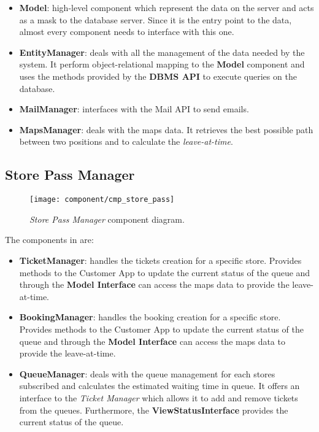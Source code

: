 \begin{itemize}
	\item \textbf{Model}: high-level component which represent the data on the server and acts as a mask to the database server. Since it is the entry point to the data, almost every component needs to interface with this one.
	
	\item \textbf{EntityManager}: deals with all the management of the data needed by the system. It perform object-relational mapping to the \textbf{Model} component and uses the methods provided by the \textbf{DBMS API} to execute queries on the database.
	
	\item \textbf{MailManager}: interfaces with the Mail API to send emails.	
	
	\item \textbf{MapsManager}: deals with the maps data. It retrieves the best possible path between two positions and to calculate the \textit{leave-at-time}.
\end{itemize}

\clearpage

\subsection{Store Pass Manager}

\begin{figure}[H]
	\centering
	\texttt{[image: component/cmp\_store\_pass]}
	\caption{\textit{Store Pass Manager} component diagram.}
	\label{fig:cmp_store_pass}
\end{figure}

The components in  are:
\begin{itemize}
	\item \textbf{TicketManager}: handles the tickets creation for a specific store. Provides methods to the Customer App to update the current status of the queue and through the \textbf{Model Interface} can access the maps data to provide the leave-at-time.
	
	\item \textbf{BookingManager}: handles the booking creation for a specific store. Provides methods to the Customer App to update the current status of the queue and through the \textbf{Model Interface} can access the maps data to provide the leave-at-time.
	
	\item \textbf{QueueManager}: deals with the queue management for each stores subscribed and calculates the estimated waiting time in queue. It offers an interface to the \textit{Ticket Manager} which allows it to add and remove tickets from the queues. Furthermore, the \textbf{ViewStatusInterface} provides the current status of the queue.
\end{itemize}


